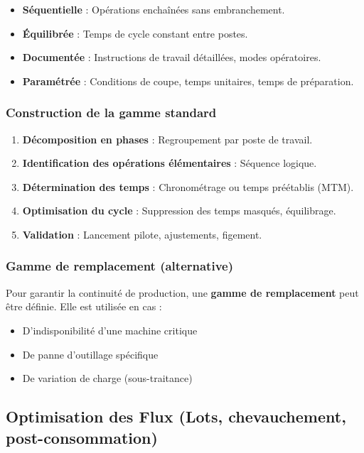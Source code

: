 \documentclass{article}
\begin{document}
\begin{itemize}
    \item \textbf{Séquentielle} : Opérations enchaînées sans embranchement.
    \item \textbf{Équilibrée} : Temps de cycle constant entre postes.
    \item \textbf{Documentée} : Instructions de travail détaillées, modes opératoires.
    \item \textbf{Paramétrée} : Conditions de coupe, temps unitaires, temps de préparation.
\end{itemize}

\subsubsection{Construction de la gamme standard}

\begin{enumerate}
    \item \textbf{Décomposition en phases} : Regroupement par poste de travail.
    \item \textbf{Identification des opérations élémentaires} : Séquence logique.
    \item \textbf{Détermination des temps} : Chronométrage ou temps préétablis (MTM).
    \item \textbf{Optimisation du cycle} : Suppression des temps masqués, équilibrage.
    \item \textbf{Validation} : Lancement pilote, ajustements, figement.
\end{enumerate}

\subsubsection{Gamme de remplacement (alternative)}

Pour garantir la continuité de production, une \textbf{gamme de remplacement} peut être définie. Elle est utilisée en cas :

\begin{itemize}
    \item D'indisponibilité d'une machine critique
    \item De panne d'outillage spécifique
    \item De variation de charge (sous-traitance)
\end{itemize}

\subsection{Optimisation des Flux (Lots, chevauchement, post-consommation)}
\end{document}
